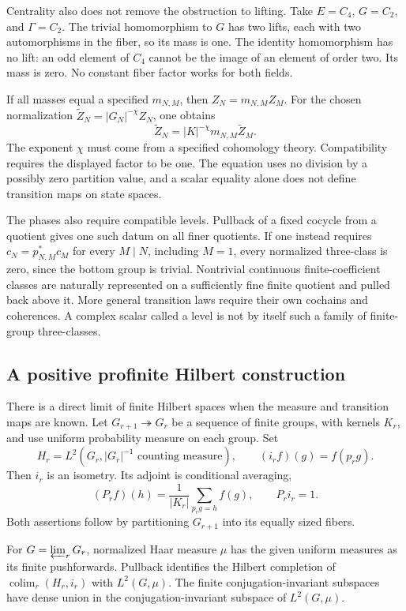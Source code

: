 Centrality also does not remove the obstruction to lifting. Take \(E=C_4\),
\(G=C_2\), and \(\Gamma=C_2\). The trivial homomorphism to \(G\) has two
lifts, each with two automorphisms in the fiber, so its mass is one. The
identity homomorphism has no lift: an odd element of \(C_4\) cannot be the
image of an element of order two. Its mass is zero. No constant fiber factor
works for both fields.

If all masses equal a specified \(m_{N,M}\), then \(Z_N=m_{N,M}Z_M\). For
the chosen normalization \(\widetilde Z_N=|G_N|^{-\chi}Z_N\), one obtains
\[
 \widetilde Z_N=|K|^{-\chi}m_{N,M}\widetilde Z_M.
\]
The exponent \(\chi\) must come from a specified cohomology theory.
Compatibility requires the displayed factor to be one. The equation uses no
division by a possibly zero partition value, and a scalar equality alone
does not define transition maps on state spaces.

The phases also require compatible levels. Pullback of a fixed cocycle from
a quotient gives one such datum on all finer quotients. If one instead
requires \(c_N=p_{N,M}^*c_M\) for every \(M\mid N\), including \(M=1\),
every normalized three-class is zero, since the bottom group is trivial.
Nontrivial continuous finite-coefficient classes are naturally represented
on a sufficiently fine finite quotient and pulled back above it. More
general transition laws require their own cochains and coherences. A complex
scalar called a level is not by itself such a family of finite-group
three-classes.

\subsection{A positive profinite Hilbert construction}

There is a direct limit of finite Hilbert spaces when the measure and
transition maps are known. Let \(G_{r+1}\twoheadrightarrow G_r\) be a
sequence of finite groups, with kernels \(K_r\), and use uniform probability
measure on each group. Set
\[
 H_r=L^2(G_r,|G_r|^{-1}\text{ counting measure}),\qquad
 (i_rf)(g)=f(p_rg).
\]
Then \(i_r\) is an isometry. Its adjoint is conditional averaging,
\begin{equation}
 (P_rf)(h)=\frac1{|K_r|}\sum_{p_rg=h}f(g),
 \qquad P_ri_r=1.
 \label{v4-arith:cs:eq:conditional-average}
\end{equation}
Both assertions follow by partitioning \(G_{r+1}\) into its equally sized
fibers.

\begin{theorem}
\label{v4-arith:cs:thm:haar}
For \(G=\varprojlim_rG_r\), normalized Haar measure \(\mu\) has the given
uniform measures as its finite pushforwards. Pullback identifies the Hilbert
completion of \(\operatorname{colim}_r(H_r,i_r)\) with \(L^2(G,\mu)\). The
finite conjugation-invariant subspaces have dense union in the
conjugation-invariant subspace of \(L^2(G,\mu)\).
\end{theorem}

